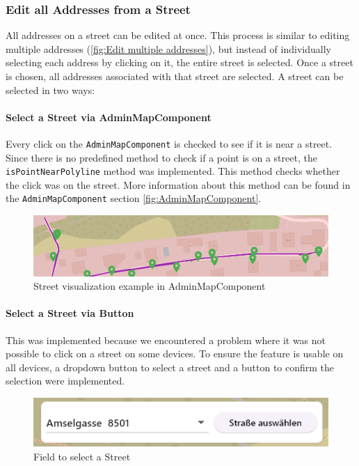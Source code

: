\subsubsection{Edit all Addresses from a Street}
All addresses on a street can be edited at once. This process is similar to editing multiple addresses (\ref{fig:Edit multiple addresses}), but instead of individually selecting each address by clicking on it, the entire street is selected. Once a street is chosen, all addresses associated with that street are selected. A street can be selected in two ways:



\paragraph{Select a Street via AdminMapComponent}
Every click on the \texttt{AdminMapComponent} is checked to see if it is near a street. Since there is no predefined method to check if a point is on a street, the \texttt{isPointNearPolyline} method was implemented. This method checks whether the click was on the street. More information about this method can be found in the \texttt{AdminMapComponent} section \ref{fig:AdminMapComponent}.\

\begin{figure}[H]
    \centering
    \includegraphics[width=0.6\linewidth]{images/AdminPanel/Street.png}
    \caption{Street visualization example in AdminMapComponent}
\end{figure}


\paragraph{Select a Street via Button}
This was implemented because we encountered a problem where it was not possible to click on a street on some devices. To ensure the feature is usable on all devices, a dropdown button to select a street and a button to confirm the selection were implemented.

\begin{figure}[H]
    \centering
    \includegraphics[width=0.6\linewidth]{images/AdminPanel/SelectStreetButton.png}
    \caption{Field to select a Street}
\end{figure}



